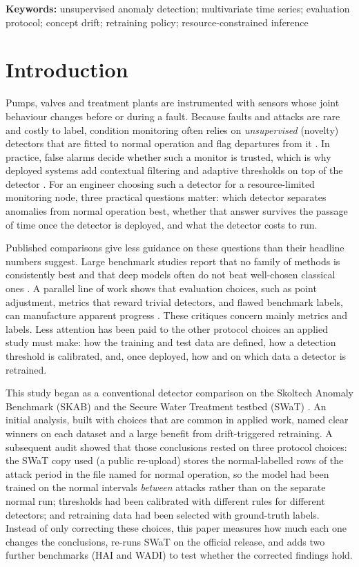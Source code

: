 \documentclass[11pt]{article}
\begin{document}
\noindent\textbf{Keywords:} unsupervised anomaly detection; multivariate time
series; evaluation protocol; concept drift; retraining policy; resource-constrained inference

\section{Introduction}

Pumps, valves and treatment plants are instrumented with sensors whose joint
behaviour changes before or during a fault. Because faults and attacks are rare
and costly to label, condition monitoring often relies on \emph{unsupervised}
(novelty) detectors that are fitted to normal operation and flag departures from
it \citep{chandola2009,mukherjee2021}. In practice, false alarms decide whether such a
monitor is trusted, which is why deployed systems add contextual filtering and
adaptive thresholds on top of the detector \citep{lee2017}. For an engineer choosing such a detector for a
resource-limited monitoring node, three practical questions matter: which
detector separates anomalies from normal operation best, whether that answer
survives the passage of time once the detector is deployed, and what the
detector costs to run.

Published comparisons give less guidance on these questions than their
headline numbers suggest. Large benchmark studies report that no family of
methods is consistently best and that deep models often do not beat
well-chosen classical ones \citep{audibert2022,schmidl2022,sarfraz2024}. A
parallel line of work shows that evaluation choices, such as point adjustment,
metrics that reward trivial detectors, and flawed benchmark labels, can
manufacture apparent progress \citep{kim2022,garg2021,wu2023,liu2024}. These
critiques concern mainly metrics and labels. Less attention has been paid to
the other protocol choices an applied study must make: how the training and
test data are defined, how a detection threshold is calibrated, and, once
deployed, how and on which data a detector is retrained.

This study began as a conventional detector comparison on the Skoltech Anomaly
Benchmark (SKAB) \citep{skab} and the Secure Water Treatment testbed (SWaT)
\citep{goh2016,mathur2016}. An initial analysis, built with choices that are
common in applied work, named clear winners on each dataset and a large benefit
from drift-triggered retraining. A subsequent audit showed that those conclusions
rested on three protocol choices: the SWaT copy used (a public re-upload) stores
the normal-labelled rows of the attack period in the file named for normal
operation, so the model had been trained on the normal intervals \emph{between}
attacks rather than on the separate normal run; thresholds had been calibrated
with different rules for different detectors; and retraining data had been
selected with ground-truth labels. Instead of only correcting these choices, this
paper measures how much each one changes the conclusions, re-runs SWaT on the official
release, and adds two further benchmarks (HAI and WADI) to test whether the corrected
findings hold.
\end{document}
